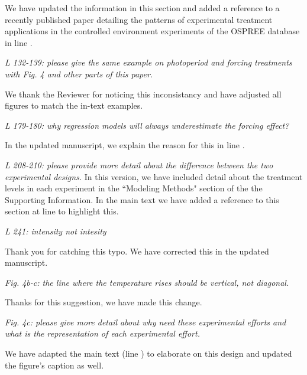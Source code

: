\documentclass[11pt]{article}
\begin{document}
We have updated the information in this section and added a reference to a recently published paper detailing the patterns of experimental treatment applications in the controlled environment experiments of the OSPREE database in line .

\emph{L 132-139: please give the same example on photoperiod and forcing treatments with Fig. 4 and other parts of this paper.}

We thank the Reviewer for noticing this inconsistancy and have adjusted all figures to match the in-text examples.

\emph{L 179-180: why regression models will always underestimate the forcing effect?}

In the updated manuscript, we explain the reason for this in line .

\emph{L 208-210: please provide more detail about the difference between the two experimental designs.}
In this version, we have included detail about the treatment levels in each experiment in the ``Modeling Methods" section of the the Supporting Information. In the main text we have added a reference to this section at line  to highlight this.

\emph{L 241: intensity not intesity}

Thank you for catching this typo. We have corrected this in the updated manuscript.

\emph{Fig. 4b-c: the line where the temperature rises should be vertical, not diagonal.}

Thanks for this suggestion, we have made this change.

\emph{Fig. 4c: please give more detail about why need these experimental efforts and what is the representation of each experimental effort.}

 We have adapted the main text (line ) to elaborate on this design and updated the figure's caption as well.
\end{document}
